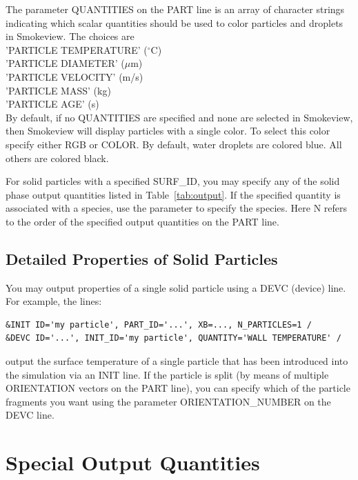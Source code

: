 \documentclass[11pt]{book}
\begin{document}
The parameter {\ct QUANTITIES} on the {\ct PART} line is an array of character strings indicating which scalar quantities should be used to color particles and droplets in Smokeview. The choices are \\
{\ct 'PARTICLE TEMPERATURE'} ($^\circ$C) \\
{\ct 'PARTICLE DIAMETER'} ($\mu$m) \\
{\ct 'PARTICLE VELOCITY'} (m/s) \\
{\ct 'PARTICLE MASS'} (kg) \\
{\ct 'PARTICLE AGE'} (s) \\
By default, if no {\ct QUANTITIES} are specified and none are selected in Smokeview, then Smokeview will display particles with a single color. To select this color specify either {\ct RGB} or {\ct COLOR}. By default, water droplets are colored blue. All others are colored black.

For solid particles with a specified {\ct SURF\_ID}, you may specify any of the solid phase output quantities listed in Table~\ref{tab:output}. If the specified quantity is associated with a species, use the parameter  to specify the species. Here {\ct N} refers to the order of the specified output quantities on the {\ct PART} line.


\subsection{Detailed Properties of Solid Particles}

You may output properties of a single solid particle using a {\ct DEVC} (device) line. For example, the lines:
\begin{lstlisting}
&INIT ID='my particle', PART_ID='...', XB=..., N_PARTICLES=1 /
&DEVC ID='...', INIT_ID='my particle', QUANTITY='WALL TEMPERATURE' /
\end{lstlisting}
output the surface temperature of a single particle that has been introduced into the simulation via an {\ct INIT} line. If the particle is split (by means of multiple {\ct ORIENTATION} vectors on the {\ct PART} line), you can specify which of the particle fragments you want using the parameter {\ct ORIENTATION\_NUMBER} on the {\ct DEVC} line.





\section{Special Output Quantities}
\end{document}
